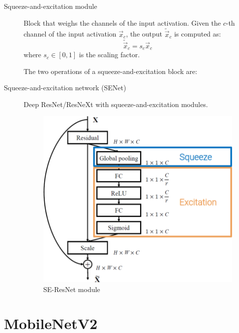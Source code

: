 \begin{description}
    \item[Squeeze-and-excitation module] 
        Block that weighs the channels of the input activation.
        Given the $c$-th channel of the input activation $\vec{x}_c$, the output $\tilde{\vec{x}}_c$ is computed as:
        \[ \tilde{\vec{x}}_c = s_c \vec{x}_c \]
        where $s_c \in [0, 1]$ is the scaling factor.

        The two operations of a squeeze-and-excitation block are:


    \item[Squeeze-and-excitation network (SENet)]
        Deep ResNet/ResNeXt with squeeze-and-excitation modules.

        \begin{figure}[H]
            \centering
            \includegraphics[width=0.4\linewidth]{./img/se_resnet.png}
            \caption{SE-ResNet module}
        \end{figure}
\end{description}



\section{MobileNetV2}


